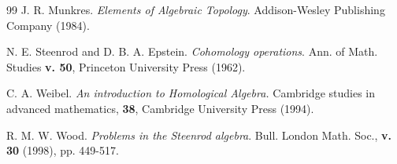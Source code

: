 \begin{thebibliography}{99}
 J. R. Munkres. {\em Elements of Algebraic
Topology}. Addison-Wesley Publishing Company (1984).

 N. E. Steenrod and D. B. A. Epstein. {\em
Cohomology operations}. Ann. of Math. Studies {\bf v. 50},
Princeton University Press (1962).

 C. A. Weibel. {\em An introduction to Homological
Algebra.} Cambridge studies in advanced mathematics, {\bf 38},
Cambridge University Press (1994).

 R. M. W. Wood. {\em Problems in the Steenrod
algebra}. Bull. London Math. Soc., {\bf v. 30} (1998), pp. 449-517.
\end{thebibliography}


